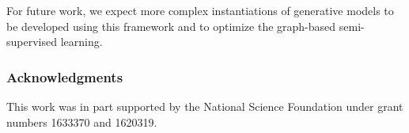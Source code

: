 \documentclass{article}
\begin{document}
For future work, we expect more complex instantiations of generative models to be developed using this framework and to optimize the graph-based semi-supervised learning. 
\subsubsection*{Acknowledgments}
This work was in part supported by the National Science Foundation under grant numbers 1633370 and 1620319.



\end{document}
